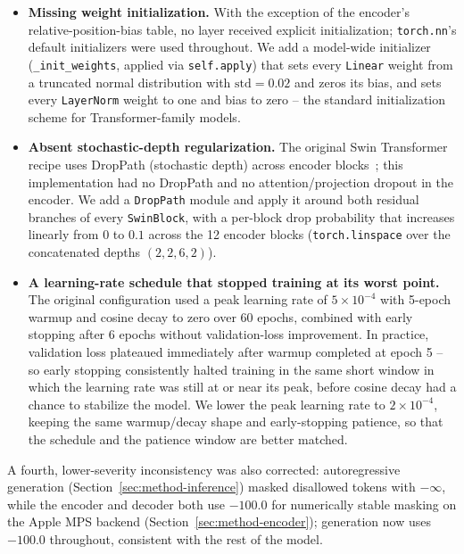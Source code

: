 \documentclass[conference]{IEEEtran}
\begin{document}
\begin{itemize}
    \item \textbf{Missing weight initialization.} With the exception of the encoder's relative-position-bias table, no layer received explicit initialization; \texttt{torch.nn}'s default initializers were used throughout. We add a model-wide initializer (\texttt{\_init\_weights}, applied via \texttt{self.apply}) that sets every \texttt{Linear} weight from a truncated normal distribution with $\text{std}=0.02$ and zeros its bias, and sets every \texttt{LayerNorm} weight to one and bias to zero -- the standard initialization scheme for Transformer-family models.
    \item \textbf{Absent stochastic-depth regularization.} The original Swin Transformer recipe uses DropPath (stochastic depth) across encoder blocks~\cite{liu2021swin}; this implementation had no DropPath and no attention/projection dropout in the encoder. We add a \texttt{DropPath} module and apply it around both residual branches of every \texttt{SwinBlock}, with a per-block drop probability that increases linearly from $0$ to $0.1$ across the 12 encoder blocks (\texttt{torch.linspace} over the concatenated depths $(2,2,6,2)$).
    \item \textbf{A learning-rate schedule that stopped training at its worst point.} The original configuration used a peak learning rate of $5\times10^{-4}$ with 5-epoch warmup and cosine decay to zero over 60 epochs, combined with early stopping after 6 epochs without validation-loss improvement. In practice, validation loss plateaued immediately after warmup completed at epoch 5 -- so early stopping consistently halted training in the same short window in which the learning rate was still at or near its peak, before cosine decay had a chance to stabilize the model. We lower the peak learning rate to $2\times10^{-4}$, keeping the same warmup/decay shape and early-stopping patience, so that the schedule and the patience window are better matched.
\end{itemize}
A fourth, lower-severity inconsistency was also corrected: autoregressive generation (Section~\ref{sec:method-inference}) masked disallowed tokens with $-\infty$, while the encoder and decoder both use $-100.0$ for numerically stable masking on the Apple MPS backend (Section~\ref{sec:method-encoder}); generation now uses $-100.0$ throughout, consistent with the rest of the model.
\end{document}
